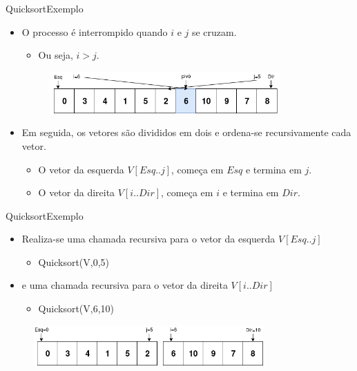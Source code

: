 \documentclass[aspectratio=169]{beamer}
\begin{document}

\begin{frame}{Quicksort}{Exemplo}
\begin{itemize}
 \item O processo é interrompido quando $i$ e $j$ se cruzam.
 \begin{itemize}
 \item Ou seja, $i > j$.
 \end{itemize} 


\begin{figure}[!h]
  \centering
  \includegraphics[width=250pt]{imgs/quick/quick14.png}
  \label{fig_quick14}
\end{figure}

\item Em seguida, os vetores são divididos em dois e ordena-se recursivamente cada vetor.
\begin{itemize}
\item O vetor da esquerda $V[Esq .. j]$, começa em $Esq$ e termina em $j$.
\item O vetor da direita $V[i .. Dir]$, começa em $i$ e termina em $Dir$.
\end{itemize}
\end{itemize}
\end{frame}


\begin{frame}{Quicksort}{Exemplo}
\begin{itemize}
 \item Realiza-se uma chamada recursiva para o vetor da esquerda $V[Esq .. j]$
 \begin{itemize}
 \item Quicksort(V,0,5)
 \end{itemize}
 \item e uma chamada recursiva para o vetor da direita $V[i .. Dir]$
 \begin{itemize}
 \item Quicksort(V,6,10)
 \end{itemize} 
\end{itemize}

\begin{figure}[!h]
  \centering
  \includegraphics[width=250pt]{imgs/quick/quick15.png}
  \label{fig_quick15}
\end{figure}
\end{frame}
\end{document}
